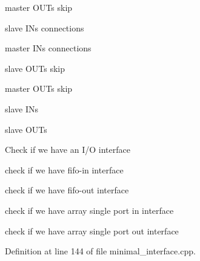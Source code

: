 master O\+U\+Ts skip

slave I\+Ns connections

master I\+Ns connections

slave O\+U\+Ts skip

master O\+U\+Ts skip

slave I\+Ns

slave O\+U\+Ts

Check if we have an I/O interface

check if we have fifo-\/in interface

check if we have fifo-\/out interface

check if we have array single port in interface

check if we have array single port out interface 

Definition at line 144 of file minimal\+\_\+interface.\+cpp.



